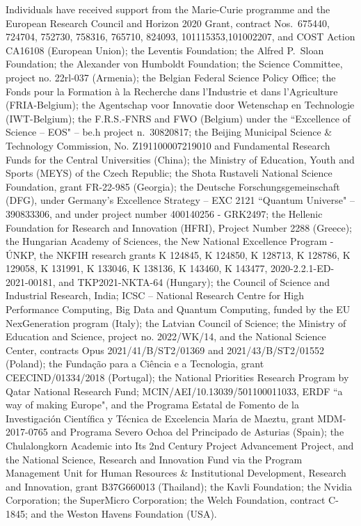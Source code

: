 \begin{acknowledgments}
 Individuals have received support from the Marie-Curie programme and the European Research Council and Horizon 2020 Grant, contract Nos.\ 675440, 724704, 752730, 758316, 765710, 824093, 101115353,101002207, and COST Action CA16108 (European Union); the Leventis Foundation; the Alfred P.\ Sloan Foundation; the Alexander von Humboldt Foundation; the Science Committee, project no. 22rl-037 (Armenia); the Belgian Federal Science Policy Office; the Fonds pour la Formation \`a la Recherche dans l'Industrie et dans l'Agriculture (FRIA-Belgium); the Agentschap voor Innovatie door Wetenschap en Technologie (IWT-Belgium); the F.R.S.-FNRS and FWO (Belgium) under the ``Excellence of Science -- EOS" -- be.h project n.\ 30820817; the Beijing Municipal Science \& Technology Commission, No. Z191100007219010 and Fundamental Research Funds for the Central Universities (China); the Ministry of Education, Youth and Sports (MEYS) of the Czech Republic; the Shota Rustaveli National Science Foundation, grant FR-22-985 (Georgia); the Deutsche Forschungsgemeinschaft (DFG), under Germany's Excellence Strategy -- EXC 2121 ``Quantum Universe" -- 390833306, and under project number 400140256 - GRK2497; the Hellenic Foundation for Research and Innovation (HFRI), Project Number 2288 (Greece); the Hungarian Academy of Sciences, the New National Excellence Program - \'UNKP, the NKFIH research grants K 124845, K 124850, K 128713, K 128786, K 129058, K 131991, K 133046, K 138136, K 143460, K 143477, 2020-2.2.1-ED-2021-00181, and TKP2021-NKTA-64 (Hungary); the Council of Science and Industrial Research, India; ICSC -- National Research Centre for High Performance Computing, Big Data and Quantum Computing, funded by the EU NexGeneration program (Italy); the Latvian Council of Science; the Ministry of Education and Science, project no. 2022/WK/14, and the National Science Center, contracts Opus 2021/41/B/ST2/01369 and 2021/43/B/ST2/01552 (Poland); the Funda\c{c}\~ao para a Ci\^encia e a Tecnologia, grant CEECIND/01334/2018 (Portugal); the National Priorities Research Program by Qatar National Research Fund; MCIN/AEI/10.13039/501100011033, ERDF ``a way of making Europe", and the Programa Estatal de Fomento de la Investigaci{\'o}n Cient{\'i}fica y T{\'e}cnica de Excelencia Mar\'{\i}a de Maeztu, grant MDM-2017-0765 and Programa Severo Ochoa del Principado de Asturias (Spain); the Chulalongkorn Academic into Its 2nd Century Project Advancement Project, and the National Science, Research and Innovation Fund via the Program Management Unit for Human Resources \& Institutional Development, Research and Innovation, grant B37G660013 (Thailand); the Kavli Foundation; the Nvidia Corporation; the SuperMicro Corporation; the Welch Foundation, contract C-1845; and the Weston Havens Foundation (USA).
\end{acknowledgments}


